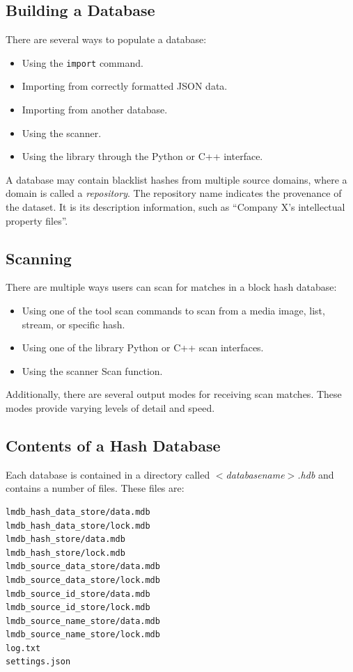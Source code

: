 \documentclass[11pt,fleqn]{article} %
\begin{document}
\subsection{Building a \hdb Database}
There are several ways to populate a database:

\begin{itemize}
\item Using the \hdb \verb+import+ command.
\item Importing from correctly formatted JSON data.
\item Importing from another database.
\item Using the \bulk \hdb scanner.
\item Using the \hdb library through the Python or C++ interface.
\end{itemize}

A database may contain blacklist hashes from multiple source domains,
where a domain is called a \textit{repository}.
The repository name indicates the provenance of the dataset.
It is its description information, such as ``Company X's intellectual property files''.\\

\subsection{Scanning}
There are multiple ways users can scan for matches in a block hash database:

\begin{itemize}
\item Using one of the \hdb tool scan commands to scan from a media image,
list, stream, or specific hash.
\item Using one of the \hdb library Python or C++ scan interfaces.
\item Using the \bulk \hdb scanner Scan function.
\end{itemize}

Additionally, there are several output modes for receiving scan matches. These modes provide varying levels of detail and speed.

\subsection{Contents of a Hash Database}
\label{ContentsOfDB}
Each \hdb database is contained in a directory called \textit{$<$databasename$>$.hdb} and contains a number of files. These files are:

\begingroup
\footnotesize
\begin{Verbatim}[fontfamily=courier]
lmdb_hash_data_store/data.mdb
lmdb_hash_data_store/lock.mdb
lmdb_hash_store/data.mdb
lmdb_hash_store/lock.mdb
lmdb_source_data_store/data.mdb
lmdb_source_data_store/lock.mdb
lmdb_source_id_store/data.mdb
lmdb_source_id_store/lock.mdb
lmdb_source_name_store/data.mdb
lmdb_source_name_store/lock.mdb
log.txt
settings.json
\end{Verbatim}
\endgroup
\end{document}
